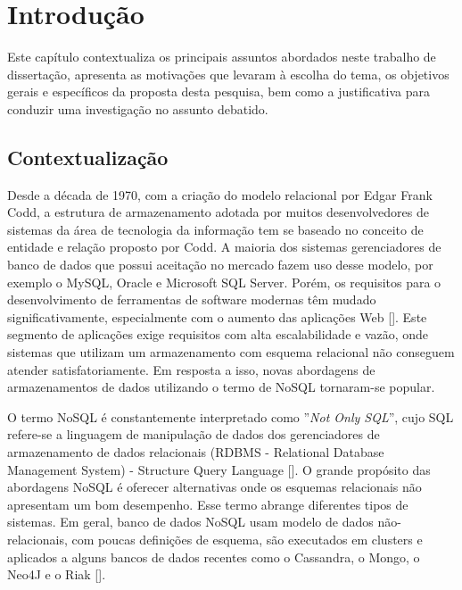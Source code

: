 \chapter{Introdução}
\label{chp:introduction}


\noindent Este capítulo contextualiza os principais assuntos abordados neste trabalho de dissertação, apresenta as motivações que levaram à escolha do tema, os objetivos gerais e específicos da proposta desta pesquisa, bem como a justificativa para conduzir uma investigação no assunto debatido.
\clearpage


\section{Contextualização}

Desde a década de 1970, com a criação do modelo relacional por Edgar Frank Codd, a estrutura de armazenamento adotada por muitos desenvolvedores de sistemas da área de tecnologia da informação tem se baseado no conceito de entidade e relação proposto por Codd. A maioria dos sistemas gerenciadores de banco de dados que possui aceitação no mercado fazem uso desse modelo, por exemplo o MySQL, Oracle e Microsoft SQL Server. Porém, os requisitos para o desenvolvimento de ferramentas de software modernas têm mudado significativamente, especialmente com o aumento das aplicações Web [\cite{nasholm:2012}]. Este segmento de aplicações exige requisitos com alta escalabilidade e vazão, onde sistemas que utilizam um armazenamento com esquema relacional não conseguem atender satisfatoriamente. Em resposta a isso, novas abordagens de armazenamentos de dados utilizando o termo de NoSQL tornaram-se popular.

O termo NoSQL é constantemente interpretado como  ''\emph{Not Only SQL}'', cujo SQL refere-se a linguagem de manipulação de dados dos gerenciadores de armazenamento de dados relacionais (RDBMS - Relational Database Management System) - Structure Query Language [\cite{nasholm:2012}]. O grande propósito das abordagens NoSQL é oferecer alternativas onde os esquemas relacionais não apresentam um bom desempenho. Esse termo abrange diferentes tipos de sistemas. Em geral, banco de dados NoSQL usam modelo de dados não-relacionais, com poucas definições de esquema, são executados em clusters e aplicados a alguns bancos de dados recentes como o Cassandra, o Mongo, o Neo4J e o Riak [\cite{fowler:2013}].

